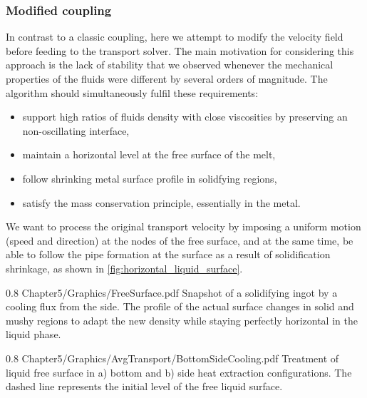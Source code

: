 \subsubsection{Modified coupling}
In contrast to a classic coupling, here we attempt to modify the velocity field before feeding to the transport solver.
The main motivation for considering this approach is the lack of stability that we observed whenever the mechanical
properties of the fluids were different by several orders of magnitude.
The algorithm should simultaneously fulfil these requirements: 
\begin{itemize}
\itemsep0em
\item support high ratios of fluids density with close viscosities by preserving an non-oscillating interface,
\item maintain a horizontal level at the free surface of the melt,
\item follow shrinking metal surface profile in solidfying regions,
\item satisfy the mass conservation principle, essentially in the metal.
\end{itemize}
We want to process the original transport velocity by imposing a uniform motion (speed and direction) 
at the nodes of the free surface, and at the same time, be able to follow the pipe formation at the 
surface as a result of solidification shrinkage, as shown in \cref{fig:horizontal_liquid_surface}.

\begin{figureth}
{0.8}
{Chapter5/Graphics/FreeSurface.pdf}
{Snapshot of a solidifying ingot by a cooling flux from the side. The profile of the actual surface changes in solid and mushy regions
to adapt the new density while staying perfectly horizontal in the liquid phase.}
\label{fig:horizontal_liquid_surface}
\end{figureth}
%
%
\begin{figureth}
{0.8}
{Chapter5/Graphics/AvgTransport/BottomSideCooling.pdf}
{Treatment of liquid free surface in a) bottom and b) side heat extraction configurations. The dashed line represents the 
initial level of the free liquid surface.}
\label{fig:bottom_side_cooling}
\end{figureth}


